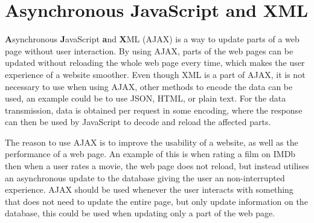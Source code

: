 \section{Asynchronous JavaScript and XML}
\textbf{A}synchronous \textbf{J}avaScript \textbf{a}nd \textbf{X}ML (AJAX) is a way to update parts of a web page without user interaction.
By using AJAX, parts of the web pages can be updated without reloading the whole web page every time, which makes the user experience of a website smoother.
Even though XML is a part of AJAX, it is not necessary to use when using AJAX, other methods to encode the data can be used, an example could be to use JSON, HTML, or plain text.
For the data transmission, data is obtained per request in some encoding, where the response can then be used by JavaScript to decode and reload the affected parts.

The reason to use AJAX is to improve the usability of a website, as well as the performance of a web page.
An example of this is when rating a film on IMDb \citep{misc:imdb} then when a user rates a movie, the web page does not reload, but instead utilises an asynchronous update to the database giving the user an non-interrupted experience.
AJAX should be used whenever the user interacts with something that does not need to update the entire page, but only update information on the database, this could be used when updating only a part of the web page.